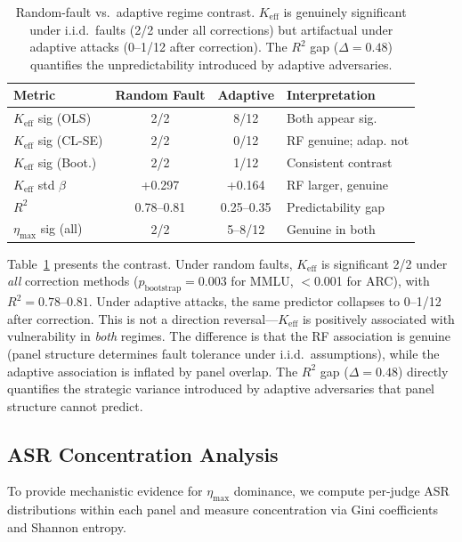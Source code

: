 \documentclass[11pt,a4paper]{article}
\begin{document}
\begin{table}[t]
\centering
\small
\begin{tabular}{lccl}
\toprule
\textbf{Metric} & \textbf{Random Fault} & \textbf{Adaptive} & \textbf{Interpretation} \\
\midrule
$K_{\text{eff}}$ sig (OLS) & 2/2 & 8/12 & Both appear sig. \\
$K_{\text{eff}}$ sig (CL-SE) & 2/2 & 0/12 & RF genuine; adap. not \\
$K_{\text{eff}}$ sig (Boot.) & 2/2 & 1/12 & Consistent contrast \\
$K_{\text{eff}}$ std $\beta$ & +0.297 & +0.164 & RF larger, genuine \\
$R^2$ & 0.78--0.81 & 0.25--0.35 & Predictability gap \\
$\eta_{\max}$ sig (all) & 2/2 & 5--8/12 & Genuine in both \\
\bottomrule
\end{tabular}
\caption{Random-fault vs.\ adaptive regime contrast. $K_{\text{eff}}$ is genuinely significant under i.i.d.\ faults (2/2 under all corrections) but artifactual under adaptive attacks (0--1/12 after correction). The $R^2$ gap ($\Delta = 0.48$) quantifies the unpredictability introduced by adaptive adversaries.}
\label{tab:rf_contrast}
\end{table}

Table~\ref{tab:rf_contrast} presents the contrast. Under random faults, $K_{\text{eff}}$ is significant 2/2 under \emph{all} correction methods ($p_{\text{bootstrap}} = 0.003$ for MMLU, $<$0.001 for ARC), with $R^2 = 0.78$--$0.81$. Under adaptive attacks, the same predictor collapses to 0--1/12 after correction. This is not a direction reversal---$K_{\text{eff}}$ is positively associated with vulnerability in \emph{both} regimes. The difference is that the RF association is genuine (panel structure determines fault tolerance under i.i.d.\ assumptions), while the adaptive association is inflated by panel overlap. The $R^2$ gap ($\Delta = 0.48$) directly quantifies the strategic variance introduced by adaptive adversaries that panel structure cannot predict.

\subsection{ASR Concentration Analysis}
\label{sec:concentration}

To provide mechanistic evidence for $\eta_{\max}$ dominance, we compute per-judge ASR distributions within each panel and measure concentration via Gini coefficients and Shannon entropy.
\end{document}
